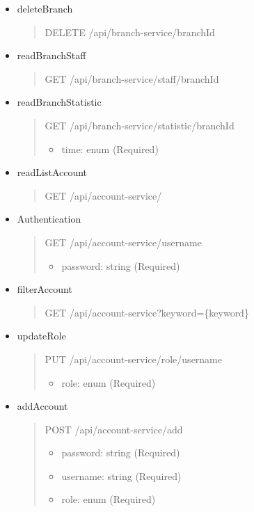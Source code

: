 \begin{itemize}
	\item deleteBranch
	\begin{quote}
		DELETE /api/branch-service/{branchId}
	\end{quote}

	\item readBranchStaff
	\begin{quote}
		GET /api/branch-service/staff/{branchId}
	\end{quote}

	\item readBranchStatistic
	\begin{quote}
		GET /api/branch-service/statistic/{branchId}
		\begin{itemize}
			\item time: enum (Required)
		\end{itemize}
	\end{quote}
\end{itemize}

\begin{itemize}
	\item readListAccount
	\begin{quote}
		GET /api/account-service/
	\end{quote}

	\item Authentication
	\begin{quote}
		GET /api/account-service/{username}
		\begin{itemize}
			\item password: string (Required)
		\end{itemize}
	\end{quote}

	\item filterAccount
	\begin{quote}
		GET /api/account-service?keyword=\{keyword\}
	\end{quote}

	\item updateRole
	\begin{quote}
		PUT /api/account-service/role/{username}
		\begin{itemize}
			\item role: enum (Required)
		\end{itemize}
	\end{quote}

	\item addAccount
	\begin{quote}
		POST /api/account-service/add
		\begin{itemize}
			\item password: string (Required)
			\item username: string (Required)
			\item role: enum (Required)
		\end{itemize}
	\end{quote}
\end{itemize}


